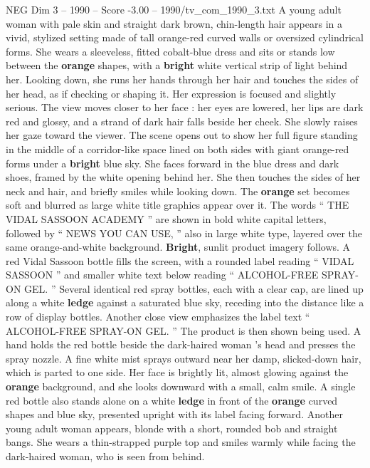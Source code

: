 \begin{textsample}{NEG Dim 3 – 1990 – Score -3.00 – 1990/tv\_com\_1990\_3.txt}  \label{ex:f3_neg_044}
A young adult woman with pale skin and straight dark brown, chin-length hair appears in a vivid, stylized setting made of tall orange-red curved walls or oversized cylindrical forms.
She wears a sleeveless, fitted cobalt-blue dress and sits or stands low between the \textbf{orange} shapes, with a \textbf{bright} white vertical strip of light behind her.
Looking down, she runs her hands through her hair and touches the sides of her head, as if checking or shaping it.
Her expression is focused and slightly serious.
The view moves closer to her face : her eyes are lowered, her lips are dark red and glossy, and a strand of dark hair falls beside her cheek.
She slowly raises her gaze toward the viewer.
The scene opens out to show her full figure standing in the middle of a corridor-like space lined on both sides with giant orange-red forms under a \textbf{bright} blue sky.
She faces forward in the blue dress and dark shoes, framed by the white opening behind her.
She then touches the sides of her neck and hair, and briefly smiles while looking down.
The \textbf{orange} set becomes soft and blurred as large white title graphics appear over it.
The words “ THE VIDAL SASSOON ACADEMY ” are shown in bold white capital letters, followed by “ NEWS YOU CAN USE, ” also in large white type, layered over the same orange-and-white background. \textbf{Bright}, sunlit product imagery follows.
A red Vidal Sassoon bottle fills the screen, with a rounded label reading “ VIDAL SASSOON ” and smaller white text below reading “ ALCOHOL-FREE SPRAY-ON GEL. ” Several identical red spray bottles, each with a clear cap, are lined up along a white \textbf{ledge} against a saturated blue sky, receding into the distance like a row of display bottles.
Another close view emphasizes the label text “ ALCOHOL-FREE SPRAY-ON GEL. ” The product is then shown being used.
A hand holds the red bottle beside the dark-haired woman ’s head and presses the spray nozzle.
A fine white mist sprays outward near her damp, slicked-down hair, which is parted to one side.
Her face is brightly lit, almost glowing against the \textbf{orange} background, and she looks downward with a small, calm smile.
A single red bottle also stands alone on a white \textbf{ledge} in front of the \textbf{orange} curved shapes and blue sky, presented upright with its label facing forward.
Another young adult woman appears, blonde with a short, rounded bob and straight bangs.
She wears a thin-strapped purple top and smiles warmly while facing the dark-haired woman, who is seen from behind.

\end{textsample}
